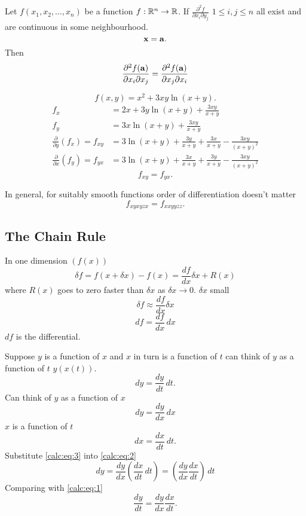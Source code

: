 \documentclass[10pt, a4paper]{article}
\begin{document}
\begin{theorem}
    Let $f(x_1, x_2, \dotsc, x_n)$ be a function $f : \mathbb{R} ^ n \rightarrow \mathbb{R}$.
    If $\frac{\partial ^ 2f}{\partial x_i \partial y_j}$ $1 \leq i, j \leq n$ all exist and are continuous in some neighbourhood.
    \[
    \mathbf{x} = \mathbf{a}.
    \]
    Then
    \[
    \frac{\partial ^ 2f(\mathbf{a})}{\partial x_i \partial x_j} = \frac{\partial ^ 2f(\mathbf{a})}{\partial x_j \partial x_i}
    \]
\end{theorem}

\begin{example}
    \[
    f(x, y) = x ^ 2 + 3xy\ln(x + y).
    \]
    \begin{align*}
        f_x &= 2x + 3y\ln(x + y) + \frac{3xy}{x + y} \\
        f_y &= 3x\ln(x + y) + \frac{3xy}{x + y} \\
        \frac{\partial}{\partial y}(f_x) = f_{xy} &= 3\ln(x + y) + \frac{3y}{x + y} + \frac{3x}{x + y} - \frac{3xy}{(x + y) ^ 2} \\
        \frac{\partial}{\partial x}(f_y) = f_{yx} &= 3\ln(x + y) + \frac{3x}{x + y} + \frac{3y}{x + y} - \frac{3xy}{(x + y) ^ 2}
    \end{align*}
    \[
    f_{xy} = f_{yx}.
    \]
\end{example}

In general,
for suitably smooth functions order of differentiation doesn't matter
\[
f_{xyxyzx} = f_{xxyyzz}.
\]

\subsection{The Chain Rule}
In one dimension $(f(x))$
\[
\delta f = f(x + \delta x) - f(x) = \frac{df}{dx}\delta x + R(x)
\]
where $R(x)$ goes to zero faster than $\delta x$ as $\delta x \rightarrow 0$.
$\delta x$ small
\[
\delta f \approx \frac{df}{dx}\delta x
\]
\[
df = \frac{df}{dx}\,dx
\]
$df$ is the differential.

Suppose $y$ is a function of $x$ and $x$ in turn is a function of $t$ can think of $y$ as a function of $t$ $y(x(t))$.
\begin{equation}\label{calc:eq:1}
    dy = \frac{dy}{dt}\,dt.
\end{equation}
Can think of $y$ as a function of $x$
\begin{equation}\label{calc:eq:2}
    dy = \frac{dy}{dx}\,dx
\end{equation}
$x$ is a function of $t$
\begin{equation}\label{calc:eq:3}
    dx = \frac{dx}{dt}\,dt.
\end{equation}
Substitute \eqref{calc:eq:3} into \eqref{calc:eq:2}
\[
dy = \frac{dy}{dx}\left(\frac{dx}{dt}\,dt\right) = \left(\frac{dy}{dx}\frac{dx}{dt}\right)\,dt
\]
Comparing with \eqref{calc:eq:1}
\[
\frac{dy}{dt} = \frac{dy}{dx}\frac{dx}{dt}.
\]
\end{document}
